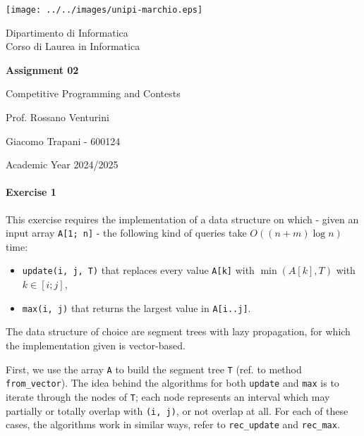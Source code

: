 \documentclass[12pt]{report}
\theoremstyle{definition}
\theoremstyle{definition}
\newcounter{cases}
\begin{document}
\begin{titlepage}
	\clearpage\thispagestyle{empty}
	\centering
	\vspace{1cm}

	\texttt{[image: ../../images/unipi-marchio.eps]}

	{\normalsize \noindent Dipartimento di Informatica \\
			Corso di Laurea in Informatica \par}
	
	\vspace{2cm}
	{\huge \textbf{Assignment 02} \par }
	\vspace{1cm}
	{\large Competitive Programming and Contests}

	\vspace{3cm}

	\begin{minipage}[t]{0.47\textwidth}
		{\large{Prof. Rossano Venturini}}
	\end{minipage}\hfill\begin{minipage}[t]{0.47\textwidth}\raggedleft
		{\large {Giacomo Trapani - 600124}}
	\end{minipage}

	\vspace{3cm}

	{\normalsize Academic Year 2024/2025 \par}

	\pagebreak
\end{titlepage}
\paragraph*{Exercise 1}
This exercise requires the implementation of a data structure on which - given
an input array \texttt{A[1; n]} - the following kind of queries take
\(O((n+m)\log n)\) time:
\begin{itemize}
	\item \texttt{update(i, j, T)} that replaces every value \texttt{A[k]} with
	\(\min(A[k], T)\) with \(k \in [i; j]\),
	\item \texttt{max(i, j)} that returns the largest value in \texttt{A[i..j]}.
\end{itemize}

The data structure of choice are segment trees with lazy propagation, for which
the implementation given is vector-based.

First, we use the array \texttt{A} to build the segment tree \texttt{T} (ref.
to method \texttt{from\_vector}). The idea behind the algorithms for
both \texttt{update} and \texttt{max} is to iterate through the nodes of \texttt{T};
each node represents an interval which may partially or totally overlap
with \texttt{(i, j)}, or not overlap at all. For each of these cases, the
algorithms work in similar ways, refer to \texttt{rec\_update} and \texttt{rec\_max}.
\end{document}
